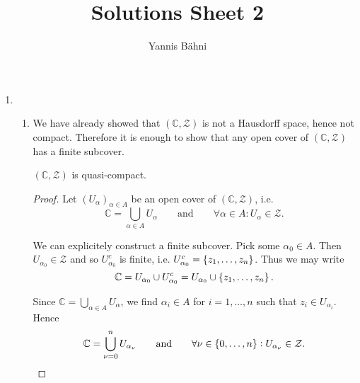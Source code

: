 

\title{Solutions Sheet 2}
\author{Yannis B\"{a}hni}
\address[Yannis B\"{a}hni]{University of Zurich, R\"{a}mistrasse 71, 8006 Zurich}


\maketitle
\thispagestyle{fancy}
\begin{enumerate}[label = \textbf{Exercise \arabic*.},wide = 0pt, itemsep=1.5ex]
	\item 
		~
		\begin{enumerate}[label = (\roman*),wide = 10pt, itemsep=1.5ex]
			\item We have already showed that $(\mathbb{C},\mathcal{Z})$ is not a Hausdorff space, hence not compact. Therefore it is enough to show that any open cover of $(\mathbb{C},\mathcal{Z})$ has a finite subcover. 
					\begin{lemma}
						$(\mathbb{C},\mathcal{Z})$ is quasi-compact.
						\label{lem:finitecover}
					\end{lemma}
				
				\begin{proof}
				Let $(U_\alpha)_{\alpha \in A}$ be an open cover of $(\mathbb{C},\mathcal{Z})$, i.e. 
				\begin{equation}
					\mathbb{C} = \bigcup_{\alpha \in A}U_\alpha \qquad \text{and} \qquad \forall \alpha \in A: U_\alpha \in \mathcal{Z}.
				\end{equation}

		We can explicitely construct a finite subcover. Pick some $\alpha_0 \in A$. Then $U_{\alpha_0} \in \mathcal{Z}$ and so $U_{\alpha_0}^c$ is finite, i.e. $U_{\alpha_0}^c = \cbr[0]{z_1,\dots,z_n}$. Thus we may write 
		\begin{equation}
			\mathbb{C} = U_{\alpha_0} \cup U_{\alpha_0}^c = U_{\alpha_0} \cup \cbr[0]{z_1,\dots,z_n}.
		\end{equation}

		Since $\mathbb{C} = \bigcup_{\alpha \in A}U_\alpha$, we find $\alpha_i \in A$ for $i = 1,\dots,n$ such that $z_i \in U_{\alpha_i}$. Hence 		  \begin{equation}
			\mathbb{C} = \bigcup_{\nu = 0}^n  U_{\alpha_\nu} \qquad \text{and} \qquad \forall \nu \in\cbr[0]{0,\dots,n}:U_{\alpha_\nu} \in \mathcal{Z}.	
		\end{equation}


\end{proof}
\end{enumerate}
\end{enumerate}
